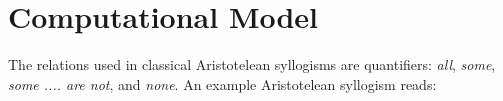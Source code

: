 \documentclass[floatsintext, doc]{apa6}
\begin{document}
%
%
%
%
%
%
%
%


\section{Computational Model}


The relations used in classical Aristotelean syllogisms are quantifiers: \emph{all}, \emph{some}, \emph{some .... are not}, and \emph{none}.
An example Aristotelean syllogism reads:
\end{document}
